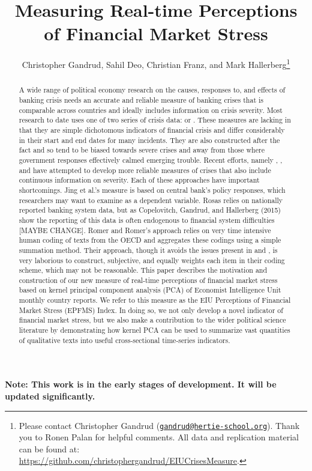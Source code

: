 \documentclass[]{article}
\title{Measuring Real-time Perceptions of Financial Market Stress}
\author{Christopher Gandrud, Sahil Deo, Christian Franz, and Mark Hallerberg\footnote{Please contact Christopher Gandrud
(\href{mailto:gandrud@hertie-school.org}{\nolinkurl{gandrud@hertie-school.org}}).
Thank you to Ronen Palan for helpful comments. All data and
replication material can be found at:
\url{https://github.com/christophergandrud/EIUCrisesMeasure}.}}
\begin{document}
\maketitle


\textbf{Note: This work is in the early stages of development. It will
be updated significantly.}

\begin{abstract}
A wide range of political economy research on the causes, responses to, and effects of banking crisis needs an accurate and reliable measure of banking crises that is comparable across countries and ideally includes information on crisis severity. Most research to date uses one of two series of crisis data: \cite{Reinhart2009} or \cite{laeven2013}. These measures are lacking in that they are simple dichotomous indicators of financial crisis and differ considerably in their start and end dates for many incidents. They are also constructed after the fact and so tend to be biased towards severe crises and away from those where government responses effectively calmed emerging trouble. Recent efforts, namely \cite{Jing2015}, \cite{Rosas2009}, and \cite{Romer2015} have attempted to develop more reliable measures of crises that also include continuous information on severity. Each of these approaches have important shortcomings. Jing et al.’s measure is based on central bank’s policy responses, which researchers may want to examine as a dependent variable. Rosas relies on nationally reported banking system data, but as Copelovitch, Gandrud, and Hallerberg (2015) show the reporting of this data is often endogenous to financial system difficulties [MAYBE CHANGE]. Romer and Romer’s approach relies on very time intensive human coding of texts from the OECD and aggregates these codings using a simple summation method. Their approach, though it avoids the issues present in \cite{Jing2015} and \cite{Rosas2009}, is very laborious to construct, subjective, and equally weights each item in their coding scheme, which may not be reasonable. This paper describes the motivation and construction of our new measure of real-time perceptions of financial market stress based on kernel principal component analysis (PCA) of Economist Intelligence Unit monthly country reports. We refer to this measure as the EIU Perceptions of Financial Market Stress (EPFMS) Index. In doing so, we not only develop a novel indicator of financial market stress, but we also make a contribution to the wider political science literature by demonstrating how kernel PCA can be used to summarize vast quantities of qualitative texts into useful cross-sectional time-series indicators.
\end{abstract}
\end{document}
